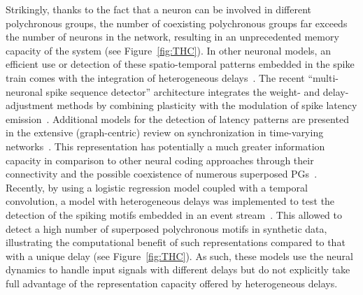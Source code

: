 \documentclass[brainsci, %
               review,accept,pdftex,moreauthors
               ]{Definitions/mdpi}
\begin{document}
Strikingly, thanks to the fact that a neuron can be involved in different polychronous groups, the number of coexisting polychronous groups far exceeds the number of neurons in the network, resulting in an unprecedented memory capacity of the system (see Figure~\ref{fig:THC}). In other neuronal models, an efficient use or detection of these spatio-temporal patterns embedded in the spike train comes with the integration of heterogeneous delays~\citep{guise_bayesian_2014,zhang_supervised_2020}. The recent ``multi-neuronal spike sequence detector'' architecture integrates the weight- and delay-adjustment methods by combining plasticity with the modulation of spike latency emission~\citep{susi_nmnsd-spiking_2021}. Additional models for the detection of latency patterns are presented in the extensive (graph-centric) review on synchronization in time-varying networks~\citep{ghosh_synchronization_2021,ghosh_synchronized_2022}. This representation has potentially a much greater information capacity in comparison to other neural coding approaches through their connectivity and the possible coexistence of numerous superposed PGs~\citep{izhikevich_polychronous_2009}. Recently, by using a logistic regression model coupled with a temporal convolution, a model with heterogeneous delays was implemented to test the detection of the spiking motifs embedded in an event stream~\citep{grimaldi_learning_2022}. This allowed to detect a high number of superposed polychronous motifs in synthetic data, illustrating the computational benefit of such representations compared to that with a unique delay (see Figure~\ref{fig:THC}). As such, these models use the neural dynamics to handle input signals with different delays but do not explicitly take full advantage of the representation capacity offered by heterogeneous delays. 
\end{document}

